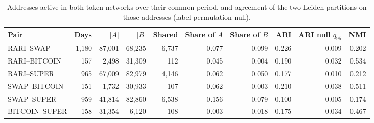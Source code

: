 \begin{table}[t]
\centering
\small
\caption{Addresses active in both token networks over their common period, and agreement of the two Leiden partitions on those addresses (label-permutation null).}
\label{tab:overlap}
\begin{tabular}{lrrrrrrrrr}
\toprule
Pair & Days & $|A|$ & $|B|$ & Shared & Share of $A$ & Share of $B$ & ARI & ARI null $q_{95}$ & NMI \\
\midrule
RARI–SWAP & 1{,}180 & 87{,}001 & 68{,}235 & 6{,}737 & 0.077 & 0.099 & 0.226 & 0.009 & 0.202 \\
RARI–BITCOIN & 157 & 2{,}498 & 31{,}309 & 112 & 0.045 & 0.004 & 0.190 & 0.032 & 0.534 \\
RARI–SUPER & 965 & 67{,}009 & 82{,}979 & 4{,}146 & 0.062 & 0.050 & 0.177 & 0.010 & 0.212 \\
SWAP–BITCOIN & 151 & 1{,}732 & 30{,}933 & 107 & 0.062 & 0.003 & 0.210 & 0.038 & 0.511 \\
SWAP–SUPER & 959 & 41{,}814 & 82{,}860 & 6{,}538 & 0.156 & 0.079 & 0.100 & 0.005 & 0.174 \\
BITCOIN–SUPER & 158 & 31{,}354 & 6{,}120 & 108 & 0.003 & 0.018 & 0.175 & 0.034 & 0.467 \\
\bottomrule
\end{tabular}
\end{table}
